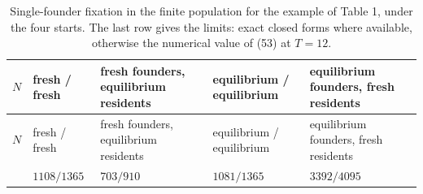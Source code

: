 \documentclass[
  british,
  11pt,
  a4paper,
]{article}
\begin{document}
\begin{longtable}[]{@{}
  >{\raggedleft\arraybackslash}p{}
  >{\raggedleft\arraybackslash}p{}
  >{\raggedleft\arraybackslash}p{}
  >{\raggedleft\arraybackslash}p{}
  >{\raggedleft\arraybackslash}p{}@{}}
\caption{Single-founder fixation in the finite population for the
example of Table 1, under the four starts. The last row gives the
limits: exact closed forms where available, otherwise the numerical
value of (53) at \(T=12\).}\tabularnewline
\toprule\noalign{}
\begin{minipage}[b]{\linewidth}\raggedleft
\(N\)
\end{minipage} & \begin{minipage}[b]{\linewidth}\raggedleft
fresh / fresh
\end{minipage} & \begin{minipage}[b]{\linewidth}\raggedleft
fresh founders, equilibrium residents
\end{minipage} & \begin{minipage}[b]{\linewidth}\raggedleft
equilibrium / equilibrium
\end{minipage} & \begin{minipage}[b]{\linewidth}\raggedleft
equilibrium founders, fresh residents
\end{minipage} \\
\midrule\noalign{}
\endfirsthead
\toprule\noalign{}
\begin{minipage}[b]{\linewidth}\raggedleft
\(N\)
\end{minipage} & \begin{minipage}[b]{\linewidth}\raggedleft
fresh / fresh
\end{minipage} & \begin{minipage}[b]{\linewidth}\raggedleft
fresh founders, equilibrium residents
\end{minipage} & \begin{minipage}[b]{\linewidth}\raggedleft
equilibrium / equilibrium
\end{minipage} & \begin{minipage}[b]{\linewidth}\raggedleft
equilibrium founders, fresh residents
\end{minipage} \\
\midrule\noalign{}
\endhead
\bottomrule\noalign{}
\endlastfoot
2 & \(1108/1365\) & \(703/910\) & \(1081/1365\) & \(3392/4095\) \\

\end{longtable}
\end{document}
